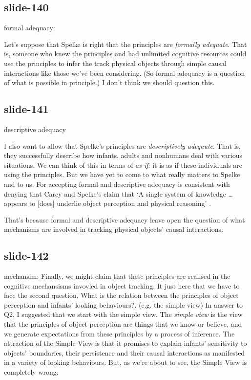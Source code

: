 \documentclass[12pt,\papersize]{extarticle}
\begin{document}
\subsection{slide-140}
formal adequacy:
 
Let's suppose that Spelke is right that the principles are \emph{formally adequate}.
That is, someone who knew the principles and had unlimited cognitive
resources could use the principles to infer the track physical objects
through simple causal interactions like those we've been considering.
(So formal adequacy is a question of what is possible in principle.)
I don't think we should question this.
 
\subsection{slide-141}
descriptive adequacy
 
I also want to allow that Spelke's principles are \emph{descriptively adeqaute}.
That is, they successfully describe how infants, adults and nonhumans
deal with various situations.
We can think of this in terms of \emph{as if}: it is as if these
individuals are using the principles.
But we have yet to come to what really matters to Spelke and to us.
For accepting formal and descriptive adequacy is consistent with denying
that Carey and Spelke's claim that ‘A single system of knowledge …
appears to [does] underlie object perception and physical reasoning’
\citep[p.\ 175]{Carey:1994bh}.
 
That's because formal and descriptive adequacy leave open the question of
what mechanisms are involved in tracking physical objects' causal
interactions.
 
\subsection{slide-142}
mechansim:
Finally, we might claim that these principles are realised in the
cognitive mechansisms invovled in object tracking.
It just here that we have to face the second question, What is the relation between the principles of object perception and infants’ looking behaviours?.
(e.g. the simple view)
In answer to Q2, I suggested that we start with the simple view.
The \emph{simple view} is the view that the principles of object perception are things that we know or believe, and we generate expectations from these principles by a process of inference.
The attraction of the Simple View is that it promises to explain infants'
sensitivity to objects' boundaries, their persistence and their causal
interactions as manifested in a variety of looking behaviours.
But, as we're about to see, the Simple View is completely wrong.
 
\end{document}
